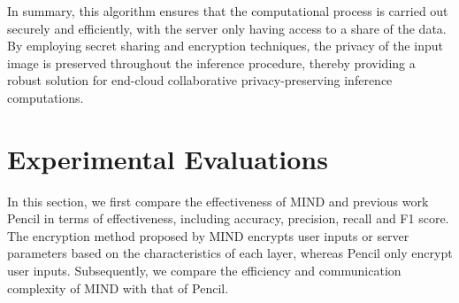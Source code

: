 \documentclass[conference]{IEEEtran}
\newcommand{\DEnc}{\texttt{DEnc}}
\newcommand{\PEnc}{\texttt{PEnc}}
\begin{document}


In summary, this algorithm ensures that the computational process is carried out securely and efficiently, with the server only having access to a share of the data. By employing secret sharing and encryption techniques, the privacy of the input image is preserved throughout the inference procedure, thereby providing a robust solution for end-cloud collaborative privacy-preserving inference computations.



\section{Experimental Evaluations}

In this section, we first compare the effectiveness of MIND and previous work Pencil\cite{liu2024pencilprivateextensiblecollaborative} in terms of effectiveness, including accuracy, precision, recall and F1 score.
The encryption method proposed by MIND encrypts user inputs or server parameters based on the characteristics of each layer, whereas Pencil only encrypt user inputs.
Subsequently, we compare the efficiency and communication complexity of MIND with that of Pencil.
\end{document}
